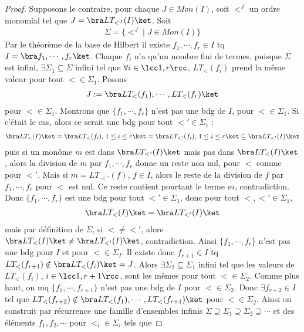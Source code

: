         \begin{proof}
            Supposons le contraire, pour chaque $J \in Mon(I)$, soit $<^J$ un ordre monomial tel que $J = \bra LT_{<^J}(I) \ket$. Soit
            \begin{align*}
                \Sigma = \{<^J \mid J \in Mon(I)\}
            \end{align*}
            Par le théorème de la base de Hilbert  il existe $f_1, \cdots, f_r \in I$ tq $I = \bra f_1, \cdots, f_r \ket$. Chaque $f_i$ n'a qu'un nombre fini de termes, puisque $\Sigma$ est infini, $\exists \Sigma_1 \subseteq \Sigma$ infini tel que $\forall i \in \lcc 1,r \rcc$, $LT_<(f_i)$ prend la même valeur pour tout $< \in \Sigma_1$. Posons
            \begin{align*}
                J := \bra LT_<(f_1), \cdots, LT_<(f_r) \ket
            \end{align*}
            pour $< \in \Sigma_1$. Montrons que $\{f_1, \cdots, f_r\}$ n'est pas une bdg de $I$, pour $< \in \Sigma_1$. Si c'était le cas, alors ce serait une bdg pour tout $<' \in \Sigma_1$ : 
            \begin{align*}
                \bra LT_<(I) \ket = \bra LT_<(f_i),\, 1 \leq i \leq r \ket  = \bra LT_{<'}(f_i),\, 1 \leq i \leq r \ket \subseteq \bra LT_{<'}(I) \ket
            \end{align*}
            puis si un monôme $m$ est dans $\bra LT_{<'}(I) \ket$ mais pas dans $\bra LT_<(I) \ket$, alors la division de $m$ par $f_1, \cdots, f_r$ donne un reste non nul, pour $<$ comme pour $<'$. Mais si $m = LT_{<'}(f)$, $f \in I$, alors le reste de la division de $f$ par $f_1, \cdots, f_r$ pour $<$ est nul. Ce reste contient pourtant le terme $m$, contradiction. Donc $\{f_1, \cdots, f_r\}$ est une bdg pour tout $<' \in \Sigma_1$, donc pour tout $<, <' \in \Sigma_1$, 
            \begin{align*}
                \bra LT_<(I) \ket = \bra LT_{<'}(I) \ket
            \end{align*}
            mais par définition de $\Sigma$, si $< \neq <'$, alors $\bra LT_<(I) \ket \neq \bra LT_{<'}(I) \ket$, contradiction. Ainsi $\{f_1, \cdots, f_r\}$ n'est pas une bdg pour $I$ et pour $< \in \Sigma_I$. Il existe donc $f_{r+1} \in I$ tq $LT_<(f_{r+1}) \notin \bra LT_<(f_i) \ket = J$. Alors $\exists \Sigma_2 \subseteq \Sigma_1$ infini tel que les valeurs de $LT_<(f_i)$, $i \in \lcc 1,r+1 \rcc$, sont les mêmes pour tout $< \in \Sigma_2$. Comme plus haut, on mq $\{f_1, \cdots, f_{r+1}\}$ n'est pas une bdg de $I$ pour $< \in \Sigma_2$. Donc $\exists f_{r+2} \in I$ tel que $LT_<(f_{r+2}) \notin \bra LT_<(f_1), \cdots, LT_<(f_{r+1}) \ket$ pour $< \in \Sigma_2$. Ainsi on construit par récurrence une famille d'ensembles infinis $\Sigma \supseteq \Sigma_1 \supseteq \Sigma_2 \supseteq \cdots$ et des éléments $f_1, f_2, \cdots$ pour $<_i \in \Sigma_i$ tels que 

\end{proof}
